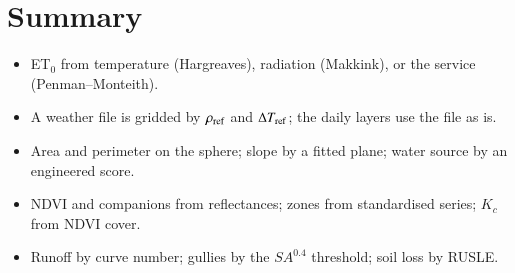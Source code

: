 \section{Summary}
\begin{itemize}
\item ET$_0$ from temperature (Hargreaves), radiation (Makkink), or the service (Penman--Monteith).
\item A weather file is gridded by $\rho_{\rm ref}$ and $\Delta T_{\rm ref}$; the daily layers use the file as is.
\item Area and perimeter on the sphere; slope by a fitted plane; water source by an engineered score.
\item NDVI and companions from reflectances; zones from standardised series; $K_c$ from NDVI cover.
\item Runoff by curve number; gullies by the $SA^{0.4}$ threshold; soil loss by RUSLE.
\end{itemize}
